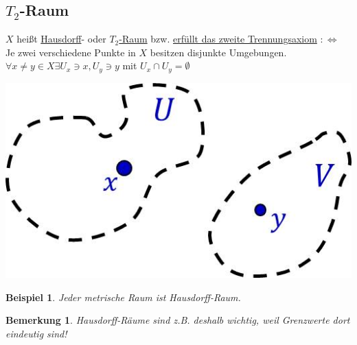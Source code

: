 \documentclass[a4paper,11pt,notitlepage]{report}
\newtheorem{remark}{Bemerkung}[chapter]
\newtheorem{example}{Beispiel}[chapter]
\newenvironment{Kasten}[1]
{
\hspace{0.05\linewidth}
\begin{center}
\begin{minipage}{0.9\linewidth}
\setlength{\fboxsep}{10pt}
\definecolor{shadecolor}{gray}{1}
\definecolor{framecolor}{gray}{0}
\def\FrameCommand{\fcolorbox{framecolor}{shadecolor}}
\MakeFramed {\FrameRestore}
\subsection{#1}
\begin{itshape}
}
{
\end{itshape}
\endMakeFramed
\end{minipage}
\end{center}
}
\begin{document}
\begin{Kasten}{$T_2$-Raum}
	$X$ heißt \underline{Hausdorff}- oder \underline{$T_2$-Raum} bzw. \underline{erfüllt das zweite Trennungsaxiom} $:\Leftrightarrow$ Je zwei verschiedene Punkte in $X$ besitzen disjunkte Umgebungen.
	\newline
	$\forall x \neq y \in X \exists U_x \ni x, U_y \ni y$ mit $U_x \cap U_y = \emptyset$
\end{Kasten}
\includegraphics[scale=0.4]{images/T2.jpg}

\begin{example}
	Jeder metrische Raum ist Hausdorff-Raum.
\end{example}

\begin{remark}
Hausdorff-Räume sind z.B. deshalb wichtig, weil Grenzwerte dort eindeutig sind!
\end{remark}
\end{document}
